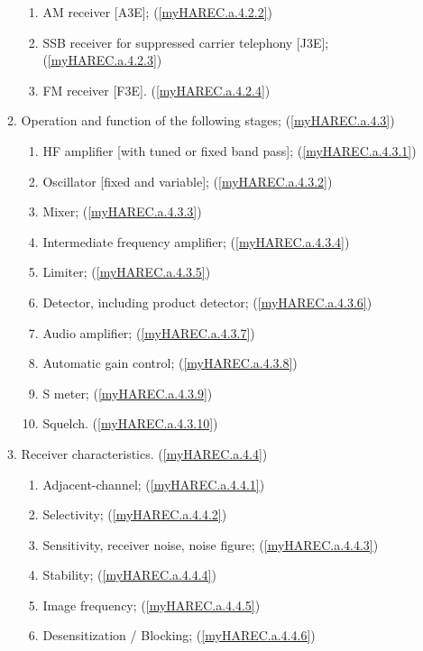 \begin{enumerate}
\begin{enumerate}[noitemsep]
\begin{enumerate}[noitemsep]
\item AM receiver [A3E]; (\ref{myHAREC.a.4.2.2})\label{HAREC.a.4.2.2}
\item SSB receiver for suppressed carrier telephony [J3E]; (\ref{myHAREC.a.4.2.3})\label{HAREC.a.4.2.3}
\item FM receiver [F3E]. (\ref{myHAREC.a.4.2.4})\label{HAREC.a.4.2.4}
\end{enumerate}
\item Operation and function of the following stages; (\ref{myHAREC.a.4.3})\label{HAREC.a.4.3}
\begin{enumerate}[noitemsep]
\item HF amplifier [with tuned or fixed band pass]; (\ref{myHAREC.a.4.3.1})\label{HAREC.a.4.3.1}
\item Oscillator [fixed and variable]; (\ref{myHAREC.a.4.3.2})\label{HAREC.a.4.3.2}
\item Mixer; (\ref{myHAREC.a.4.3.3})\label{HAREC.a.4.3.3}
\item Intermediate frequency amplifier; (\ref{myHAREC.a.4.3.4})\label{HAREC.a.4.3.4}
\item Limiter; (\ref{myHAREC.a.4.3.5})\label{HAREC.a.4.3.5}
\item Detector, including product detector; (\ref{myHAREC.a.4.3.6})\label{HAREC.a.4.3.6}
\item Audio amplifier; (\ref{myHAREC.a.4.3.7})\label{HAREC.a.4.3.7}
\item Automatic gain control; (\ref{myHAREC.a.4.3.8})\label{HAREC.a.4.3.8}
\item S meter; (\ref{myHAREC.a.4.3.9})\label{HAREC.a.4.3.9}
\item Squelch. (\ref{myHAREC.a.4.3.10})\label{HAREC.a.4.3.10}
\end{enumerate}
\item Receiver characteristics. (\ref{myHAREC.a.4.4})\label{HAREC.a.4.4}
\begin{enumerate}[noitemsep]
\item Adjacent-channel; (\ref{myHAREC.a.4.4.1})\label{HAREC.a.4.4.1}
\item Selectivity; (\ref{myHAREC.a.4.4.2})\label{HAREC.a.4.4.2}
\item Sensitivity, receiver noise, noise figure; (\ref{myHAREC.a.4.4.3})\label{HAREC.a.4.4.3}
\item Stability; (\ref{myHAREC.a.4.4.4})\label{HAREC.a.4.4.4}
\item Image frequency; (\ref{myHAREC.a.4.4.5})\label{HAREC.a.4.4.5}
\item Desensitization / Blocking; (\ref{myHAREC.a.4.4.6})\label{HAREC.a.4.4.6}

\end{enumerate}
\end{enumerate}
\end{enumerate}
